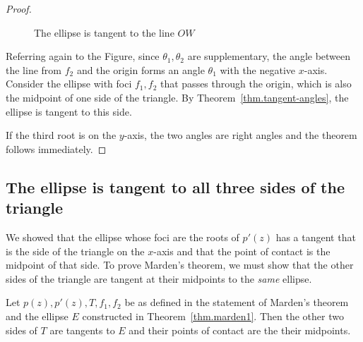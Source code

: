 \begin{proof}
\begin{figure}
\begin{center}
\begin{tikzpicture}[scale=2.5]
\end{tikzpicture}
\caption{The ellipse is tangent to the line $OW$}\label{f.marden-ellipses}
\end{center}
\end{figure}

Referring again to the Figure, since $\theta_1, \theta_2$ are supplementary, the angle between the line from $f_2$ and the origin forms an angle $\theta_1$ with the negative $x$-axis. Consider the ellipse with foci $f_1,f_2$ that passes through the origin, which is also the midpoint of one side of the triangle. By Theorem~\ref{thm.tangent-angles}, the ellipse is tangent to this side.

If the third root is on the $y$-axis, the two angles are right angles and the theorem follows immediately.\hqed
\end{proof}


\subsection*{The ellipse is tangent to all three sides of the triangle}

We showed that the ellipse whose foci are the roots of $p'(z)$ has a tangent that is the side of the triangle on the $x$-axis and that the point of contact is the midpoint of that side. To prove Marden's theorem, we must show that the other sides of the triangle are tangent at their midpoints to the \emph{same} ellipse. 

\begin{theorem}\label{thm.marden2}
Let $p(z),p'(z),T,f_1,f_2$ be as defined in the statement of Marden's theorem and the ellipse $E$ constructed in Theorem~\ref{thm.marden1}. Then the other two sides of $T$ are tangents to $E$ and their points of contact are the their midpoints.
\end{theorem}

